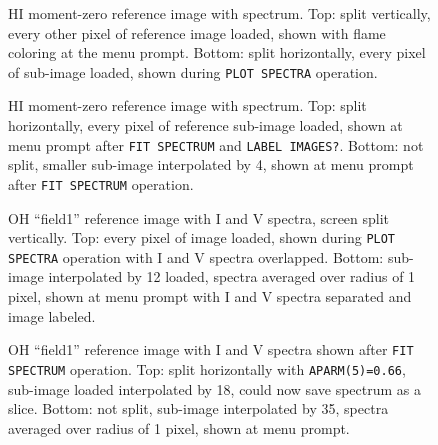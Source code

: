 \documentclass[twoside]{article}
\newcommand{\Hi}[1]{\textcolor{hicol}{#1}}
\newcommand{\putfig}[1]{\texttt{[image: \#1]}}
\begin{document}
\begin{figure}
\begin{center}
\resizebox{5.78in}{!}{\putfig{TVSPCHIa.eps}}
\centerline{\hphantom{MM}}
\resizebox{5.78in}{!}{\putfig{TVSPCHIb.eps}}
\caption{HI moment-zero reference image with spectrum.  Top: split
  vertically, every other pixel of reference image loaded, shown with
  flame coloring at the menu prompt.  Bottom: split horizontally,
  every pixel of sub-image loaded, shown during {\tt PLOT SPECTRA}
  operation.}
\label{fig:HIab}
\end{center}
\end{figure}

\begin{figure}
\begin{center}
\resizebox{5.78in}{!}{\putfig{TVSPCHIc.eps}}
\centerline{\hphantom{MM}}
\resizebox{5.78in}{!}{\putfig{TVSPCHId.eps}}
\caption{HI moment-zero reference image with spectrum.  Top: split
  horizontally, every pixel of reference sub-image loaded, shown at
  menu prompt after {\tt FIT SPECTRUM} \Hi{and {\tt LABEL IMAGES?}}\@.
  Bottom: not split, smaller sub-image interpolated by 4, shown at
  menu prompt after {\tt FIT SPECTRUM} operation.}
\label{fig:HIcd}
\end{center}
\end{figure}

\begin{figure}
\begin{center}
\resizebox{5.72in}{!}{\putfig{TVSPCOHa.eps}}
\centerline{\hphantom{MM}}
\resizebox{5.72in}{!}{\putfig{TVSPCOHb.eps}}
\caption{OH ``field1'' reference image with I and V spectra, screen
  split vertically.  Top: every pixel of image loaded, shown during
  {\tt PLOT SPECTRA} operation with I and V spectra overlapped.
  Bottom: sub-image interpolated by 12 loaded, spectra averaged over
  radius of 1 pixel, shown at menu prompt with I and V spectra
  separated \Hi{and image labeled}.}
\label{fig:OHab}
\end{center}
\end{figure}

\begin{figure}
\begin{center}
\resizebox{5.72in}{!}{\putfig{TVSPCOHc.eps}}
\centerline{\hphantom{MM}}
\resizebox{5.72in}{!}{\putfig{TVSPCOHd.eps}}
\caption{OH ``field1'' reference image with I and V spectra shown
  after {\tt FIT SPECTRUM} operation.  Top: split horizontally with
  {\tt APARM(5)=0.66}, sub-image loaded interpolated by 18, could now
  save spectrum as a slice.  Bottom: not split, sub-image interpolated
  by 35, spectra averaged over radius of 1 pixel, shown at menu
  prompt.}
\label{fig:OHcd}
\end{center}
\end{figure}
\end{document}
